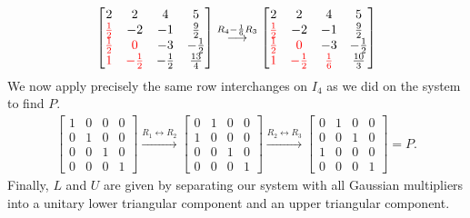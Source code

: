 \documentclass[11pt, letterpaper]{article}
\begin{document}
\begin{align*}
    \begin{bmatrix}
        2 & 2 & 4 & 5\\
        {\color{red}\frac{1}{2}}  & -2 & -1 & \frac{9}{2}\\
        {\color{red}\frac{1}{2}} & {\color{red}0} & -3& -\frac{1}{2}\\
        {\color{red}1}  & {\color{red}-\frac{1}{2}} & -\frac{1}{2} & \frac{13}{4}
    \end{bmatrix}
    \overset{R_4-\frac{1}{6}R_3}{\longrightarrow}
    \begin{bmatrix}
        2 & 2 & 4 & 5\\
        {\color{red}\frac{1}{2}}  & -2 & -1 & \frac{9}{2}\\
        {\color{red}\frac{1}{2}} & {\color{red}0} & -3& -\frac{1}{2}\\
        {\color{red}1}  & {\color{red}-\frac{1}{2}} & {\color{red}\frac{1}{6}} & \frac{10}{3}
    \end{bmatrix}
\end{align*}
We now apply precisely the same row interchanges on $I_4$ as we did on the system to find $P$.
\begin{align*}
    \begin{bmatrix}
        1 & 0 & 0 & 0\\
        0 & 1 & 0 & 0\\
        0 & 0 & 1 & 0\\
        0 & 0 & 0 & 1
    \end{bmatrix}
    \overset{R_1\leftrightarrow R_2}{\longrightarrow}
    \begin{bmatrix}
        0 & 1 & 0 & 0\\
        1 & 0 & 0 & 0\\
        0 & 0 & 1 & 0\\
        0 & 0 & 0 & 1
    \end{bmatrix}
    \overset{R_2\leftrightarrow R_3}{\longrightarrow}
    \begin{bmatrix}
        0 & 1 & 0 & 0\\
        0 & 0 & 1 & 0\\
        1 & 0 & 0 & 0\\
        0 & 0 & 0 & 1
    \end{bmatrix}
    =P.
\end{align*}
Finally, $L$ and $U$ are given by separating our system with all Gaussian multipliers into a unitary 
lower triangular component and an upper triangular component.
\end{document}
